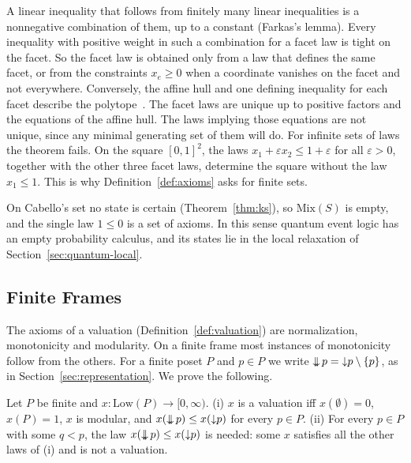 \noindent
A linear inequality that follows from finitely many linear inequalities
is a nonnegative combination of them, up to a constant (Farkas's lemma).
Every inequality with positive weight in such a combination for a facet
law is tight on the facet. So the facet law is obtained only from a law
that defines the same facet, or from the constraints $x_e \ge 0$ when a
coordinate vanishes on the facet and not everywhere. Conversely, the affine hull and one
defining inequality for each facet describe the
polytope~\cite{ziegler1995}. The facet laws are unique up to positive
factors and the equations of the affine hull. The laws implying those
equations are not unique, since any minimal generating set of them will
do. For infinite sets of laws the theorem fails. On the square
$[0,1]^2$, the laws $x_1 + \varepsilon x_2 \le 1 + \varepsilon$ for all
$\varepsilon > 0$, together with the other three facet laws, determine
the square without the law $x_1 \le 1$. This is why
Definition~\ref{def:axioms} asks for finite sets.

On Cabello's set no state is certain (Theorem~\ref{thm:ks}), so
$\mathrm{Mix}(S)$ is empty, and the single law $1 \le 0$ is a set of
axioms. In this sense quantum event logic has an empty probability
calculus, and its states lie in the local relaxation of
Section~\ref{sec:quantum-local}.

\subsection{Finite Frames}
\label{sec:axioms-frames}

The axioms of a valuation (Definition~\ref{def:valuation}) are
normalization, monotonicity and modularity. On a finite frame most
instances of monotonicity follow from the others. For a finite poset $P$
and $p \in P$ we write $\mathop{\downarrow\!\!\downarrow} p = {\downarrow} p \setminus \{p\}$, as in
Section~\ref{sec:representation}. We prove the following.

\begin{theorem}
\label{thm:axioms-frames}
Let $P$ be finite and $x : \mathrm{Low}(P) \to [0, \infty)$.
(i) $x$ is a valuation iff $x(\emptyset) = 0$, $x(P) = 1$, $x$ is
modular, and $x(\mathop{\downarrow\!\!\downarrow} p) \le x({\downarrow} p)$ for every $p \in P$.
(ii) For every $p \in P$ with some $q < p$, the law
$x(\mathop{\downarrow\!\!\downarrow} p) \le x({\downarrow} p)$ is needed: some $x$ satisfies all the
other laws of (i) and is not a valuation.
\end{theorem}

